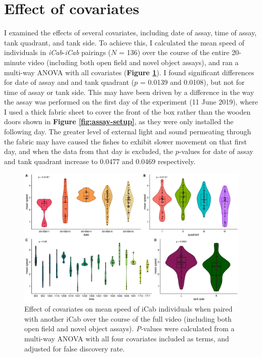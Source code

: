 \documentclass[
]{book}
\begin{document}
\hypertarget{effect-of-covariates}{%
\section{Effect of covariates}\label{effect-of-covariates}}

I examined the effects of several covariates, including date of assay, time of assay, tank quadrant, and tank side. To achieve this, I calculated the mean speed of individuals in \emph{iCab}-\emph{iCab} pairings (\(N\) = 136) over the course of the entire 20-minute video (including both open field and novel object assays), and ran a multi-way ANOVA with all covariates (\textbf{Figure \ref{fig:covariate-effects}}). I found significant differences for date of assay and and tank quadrant (\(p\) = 0.0139 and 0.0108), but not for time of assay or tank side. This may have been driven by a difference in the way the assay was performed on the first day of the experiment (11 June 2019), where I used a thick fabric sheet to cover the front of the box rather than the wooden doors shown in \textbf{Figure \ref{fig:assay-setup}}, as they were only installed the following day. The greater level of external light and sound permeating through the fabric may have caused the fishes to exhibit slower movement on that first day, and when the data from that day is excluded, the \(p\)-values for date of assay and tank quadrant increase to 0.0477 and 0.0469 respectively.



\begin{figure}
\includegraphics[width=1\linewidth]{figs/pilot/covariate_effects_no-split-by-assay} \caption{Effect of covariates on mean speed of iCab individuals when paired with another iCab over the course of the full video (including both open field and novel object assays). \emph{P}-values were calculated from a multi-way ANOVA with all four covariates included as terms, and adjusted for false discovery rate.}\label{fig:covariate-effects}
\end{figure}
\end{document}
